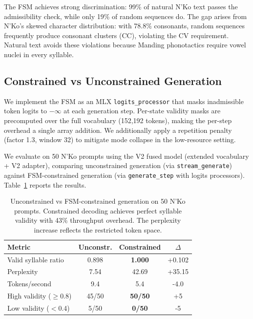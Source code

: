 \documentclass[11pt]{article}
\begin{document}
The FSM achieves strong discrimination: 99\% of natural N'Ko text passes the admissibility check, while only 19\% of random sequences do.
The gap arises from N'Ko's skewed character distribution: with 78.8\% consonants, random sequences frequently produce consonant clusters (CC), violating the CV requirement.
Natural text avoids these violations because Manding phonotactics require vowel nuclei in every syllable.

\subsection{Constrained vs Unconstrained Generation}

We implement the FSM as an MLX \texttt{logits\_processor} that masks inadmissible token logits to $-\infty$ at each generation step.
Per-state validity masks are precomputed over the full vocabulary (152,192 tokens), making the per-step overhead a single array addition.
We additionally apply a repetition penalty (factor 1.3, window 32) to mitigate mode collapse in the low-resource setting.

We evaluate on 50 N'Ko prompts using the V2 fused model (extended vocabulary + V2 adapter), comparing unconstrained generation (via \texttt{stream\_generate}) against FSM-constrained generation (via \texttt{generate\_step} with logits processors).
Table~\ref{tab:constrained-comparison} reports the results.

\begin{table}[t]
\centering
\small
\begin{tabular}{lccc}
\toprule
\textbf{Metric} & \textbf{Unconstr.} & \textbf{Constrained} & \textbf{$\Delta$} \\
\midrule
Valid syllable ratio & 0.898 & \textbf{1.000} & +0.102 \\
Perplexity & 7.54 & 42.69 & +35.15 \\
Tokens/second & 9.4 & 5.4 & -4.0 \\
High validity ($\geq$0.8) & 45/50 & \textbf{50/50} & +5 \\
Low validity ($<$0.4) & 5/50 & \textbf{0/50} & -5 \\
\bottomrule
\end{tabular}
\caption{Unconstrained vs FSM-constrained generation on 50 N'Ko prompts.
Constrained decoding achieves perfect syllable validity with 43\% throughput overhead.
The perplexity increase reflects the restricted token space.}
\label{tab:constrained-comparison}
\end{table}
\end{document}
